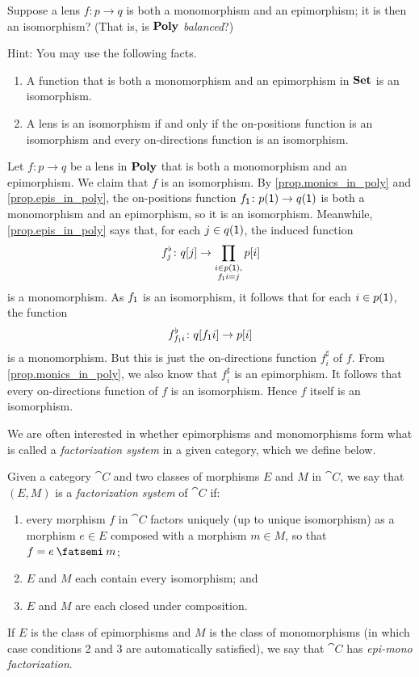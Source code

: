 \documentclass[Book-Poly]{subfiles}
\begin{document}
\begin{exercise}
Suppose a lens $f\colon p\to q$ is both a monomorphism and an epimorphism; it is then an isomorphism? (That is, is $\mathbf{Poly}$ \emph{balanced}?)

Hint: You may use the following facts.
\begin{enumerate}
    \item A function that is both a monomorphism and an epimorphism in $\mathbf{Set}$ is an isomorphism.
    \item A lens is an isomorphism if and only if the on-positions function is an isomorphism and every on-directions function is an isomorphism.
\end{enumerate}
\begin{solution}
Let $f \colon p \to q$ be a lens in $\mathbf{Poly}$ that is both a monomorphism and an epimorphism.
We claim that $f$ is an isomorphism.
By \cref{prop.monics_in_poly} and \cref{prop.epis_in_poly}, the on-positions function $f_{\textsf{1}} \colon p(\textsf{1}) \to q(\textsf{1})$ is both a monomorphism and an epimorphism, so it is an isomorphism.
Meanwhile, \cref{prop.epis_in_poly} says that, for each $j \in q(\textsf{1})$, the induced function
\[
    f^\flat_j \colon q[j] \to \prod_{\substack{i \in p(\textsf{1}), \\ f_{\textsf{1}}i = j}} p[i]
\]
is a monomorphism.
As $f_{\textsf{1}}$ is an isomorphism, it follows that for each $i \in p(\textsf{1})$, the function
\[
    f^\flat_{f_{\textsf{1}}i} \colon q[f_{\textsf{1}}i] \to p[i]
\]
is a monomorphism.
But this is just the on-directions function $f^\sharp_i$ of $f$.
From \cref{prop.monics_in_poly}, we also know that $f^\sharp_i$ is an epimorphism.
It follows that every on-directions function of $f$ is an isomorphism.
Hence $f$ itself is an isomorphism.
\end{solution}
\end{exercise}

We are often interested in whether epimorphisms and monomorphisms form what is called a \emph{factorization system} in a given category, which we define below.

\begin{definition} \label{def.factor}
Given a category $\cat{C}$ and two classes of morphisms $E$ and $M$ in $\cat{C}$, we say that $(E, M)$ is a \emph{factorization system} of $\cat{C}$ if:
\begin{enumerate}
    \item every morphism $f$ in $\cat{C}$ factors uniquely (up to unique isomorphism) as a morphism $e \in E$ composed with a morphism $m\in M$, so that $f = e\then m$;
    \item $E$ and $M$ each contain every isomorphism; and
    \item $E$ and $M$ are each closed under composition.
\end{enumerate}
If $E$ is the class of epimorphisms and $M$ is the class of monomorphisms (in which case conditions 2 and 3 are automatically satisfied), we say that $\cat{C}$ has \emph{epi-mono factorization}.
\end{definition}
\end{document}

